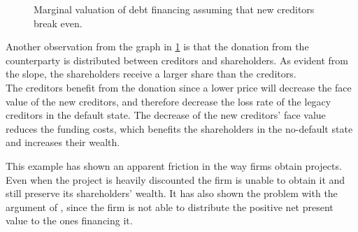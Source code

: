\documentclass[main.tex]{subfiles}
\begin{document}
        \begin{figure}
            \centering
            \resizebox{\textwidth}{!}{%
                
            }
            \caption{
                Marginal valuation of debt financing 
                assuming that new creditors break even.
            }
            \label{fig:marginal-value-debt-financing}
        \end{figure}

        Another observation from the graph in \cref{fig:marginal-value-debt-financing} is that the donation from the counterparty 
        is distributed between creditors and shareholders.
        As evident from the slope, the shareholders receive a larger share than the creditors.
        \\
        The creditors benefit from the donation since a lower price will
        decrease the face value of the new creditors, and therefore decrease the loss rate
        of the legacy creditors in the default state.
        The decrease of the new creditors' face value reduces the funding costs,
        which benefits the shareholders in the no-default state and increases their wealth.

        This example has shown an apparent friction in the way firms obtain projects.
        Even when the project is heavily discounted the firm is unable to obtain it
        and still preserve its shareholders' wealth.
        It has also shown the problem with the argument of \textcite{HullWhite2012FVA},
        since the firm is not able to distribute the positive net present value
        to the ones financing it.
        
\end{document}
